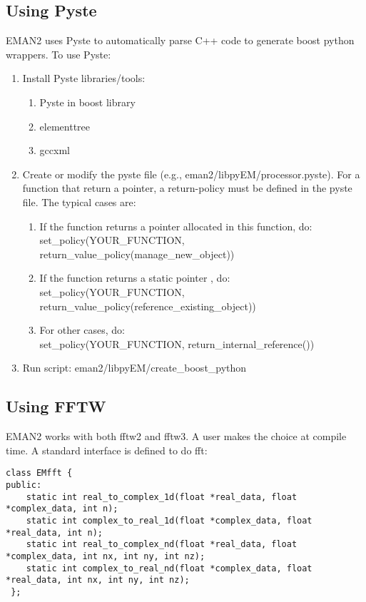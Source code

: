     \subsection{Using Pyste} 
    EMAN2 uses Pyste to automatically parse C++ code to generate boost
    python wrappers. To use Pyste:

    \begin{enumerate}
    \item
      Install Pyste libraries/tools: 
      \begin{enumerate}
      \item
	Pyste in boost library
      \item
	elementtree 
      \item
	gccxml
      \end{enumerate}
    \item
      Create or modify the pyste file (e.g.,
      eman2/libpyEM/processor.pyste). For a function that return a
      pointer, a return-policy must be defined in the pyste
      file. The typical cases are: 
      \begin{enumerate}
      \item If the function returns a pointer allocated in this
	function, do: \\	    
	set\_policy(YOUR\_FUNCTION, return\_value\_policy(manage\_new\_object))
      \item If the function returns a static pointer , do: \\
	set\_policy(YOUR\_FUNCTION, return\_value\_policy(reference\_existing\_object))
      \item For other cases, do: \\set\_policy(YOUR\_FUNCTION, return\_internal\_reference())
      \end{enumerate}
    \item
      Run script: eman2/libpyEM/create\_boost\_python
    \end{enumerate}
    
    \subsection{Using FFTW}  

    EMAN2 works with both fftw2 and fftw3. A user makes the choice at
    compile time.  A standard interface is defined to do fft:
    
    \begin{verbatim}class EMfft {
public:
    static int real_to_complex_1d(float *real_data, float *complex_data, int n);
    static int complex_to_real_1d(float *complex_data, float *real_data, int n);
    static int real_to_complex_nd(float *real_data, float *complex_data, int nx, int ny, int nz);
    static int complex_to_real_nd(float *complex_data, float *real_data, int nx, int ny, int nz);
 };\end{verbatim}

